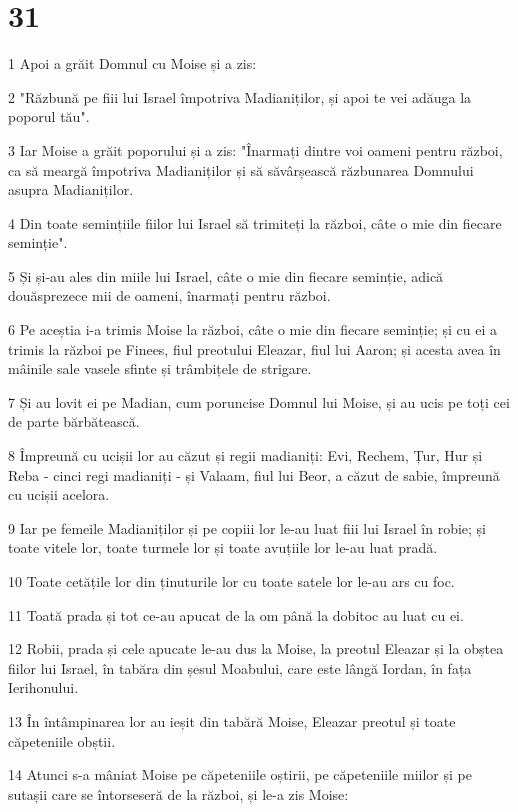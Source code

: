 \chapter{31}

\par 1 Apoi a grăit Domnul cu Moise și a zis:
\par 2 "Răzbună pe fiii lui Israel împotriva Madianiților, și apoi te vei adăuga la poporul tău".
\par 3 Iar Moise a grăit poporului și a zis: "Înarmați dintre voi oameni pentru război, ca să meargă împotriva Madianiților și să săvârșească răzbunarea Domnului asupra Madianiților.
\par 4 Din toate semințiile fiilor lui Israel să trimiteți la război, câte o mie din fiecare seminție".
\par 5 Și și-au ales din miile lui Israel, câte o mie din fiecare seminție, adică douăsprezece mii de oameni, înarmați pentru război.
\par 6 Pe aceștia i-a trimis Moise la război, câte o mie din fiecare seminție; și cu ei a trimis la război pe Finees, fiul preotului Eleazar, fiul lui Aaron; și acesta avea în mâinile sale vasele sfinte și trâmbițele de strigare.
\par 7 Și au lovit ei pe Madian, cum poruncise Domnul lui Moise, și au ucis pe toți cei de parte bărbătească.
\par 8 Împreună cu ucișii lor au căzut și regii madianiți: Evi, Rechem, Țur, Hur și Reba - cinci regi madianiți - și Valaam, fiul lui Beor, a căzut de sabie, împreună cu ucișii acelora.
\par 9 Iar pe femeile Madianiților și pe copiii lor le-au luat fiii lui Israel în robie; și toate vitele lor, toate turmele lor și toate avuțiile lor le-au luat pradă.
\par 10 Toate cetățile lor din ținuturile lor cu toate satele lor le-au ars cu foc.
\par 11 Toată prada și tot ce-au apucat de la om până la dobitoc au luat cu ei.
\par 12 Robii, prada și cele apucate le-au dus la Moise, la preotul Eleazar și la obștea fiilor lui Israel, în tabăra din șesul Moabului, care este lângă Iordan, în fața Ierihonului.
\par 13 În întâmpinarea lor au ieșit din tabără Moise, Eleazar preotul și toate căpeteniile obștii.
\par 14 Atunci s-a mâniat Moise pe căpeteniile oștirii, pe căpeteniile miilor și pe sutașii care se întorseseră de la război, și le-a zis Moise:
